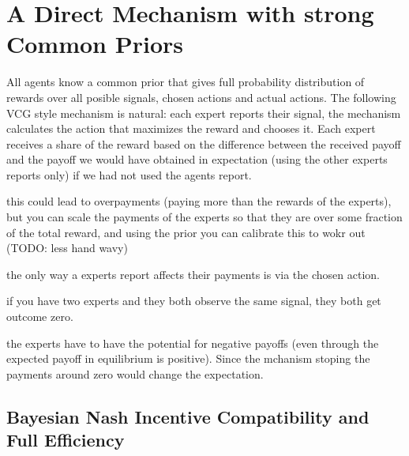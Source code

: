 \section{A Direct Mechanism with strong Common Priors}

All agents know a common prior that gives full probability distribution of rewards over all posible signals, chosen actions and actual actions. 
The following VCG style mechanism is natural: each expert reports their signal, the mechanism calculates the action that maximizes the reward and chooses it. Each expert receives a share of the reward based on the difference between the received payoff and the payoff we would have obtained in expectation (using the other experts reports only) if we had not used the agents report.



this could lead to overpayments (paying more than the rewards of the experts), but you can scale the payments of the experts so that they are over some fraction of the total reward, and using the prior you can calibrate this to wokr out (TODO: less hand wavy)

\begin{lem}
	the only way a experts report affects their payments is via the chosen action.
\end{lem}

\begin{eg}
	if you have two experts and they both observe the same signal, they both get outcome zero. 
\end{eg}



the experts have to have the potential for negative payoffs (even through the expected payoff in equilibrium is positive). Since the mchanism stoping the payments around zero would change the expectation. 


\subsection{Bayesian Nash Incentive Compatibility and Full Efficiency}

